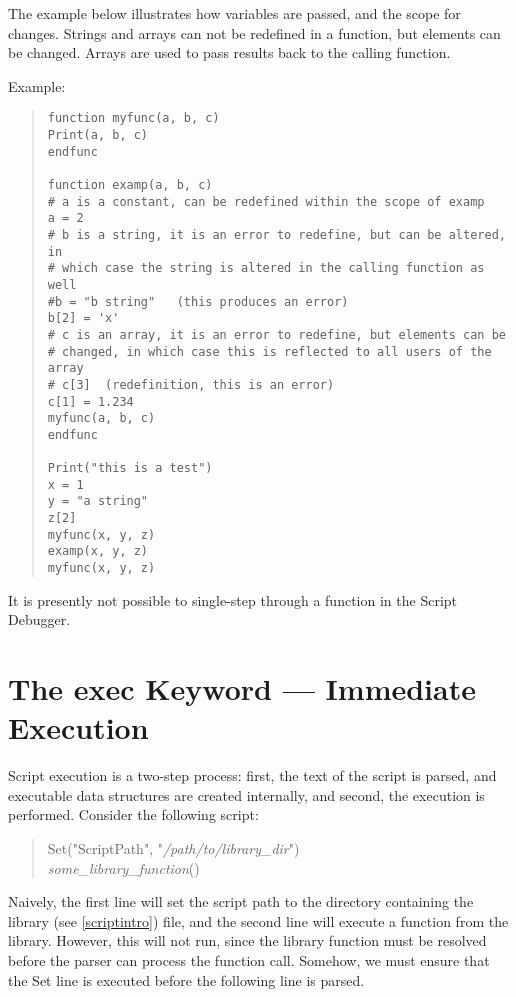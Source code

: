 The example below illustrates how variables are passed, and the
scope for changes.  Strings and arrays can not be redefined in a
function, but elements can be changed.  Arrays are used to pass
results back to the calling function.

Example:

\begin{quote}
\begin{verbatim}
function myfunc(a, b, c)
Print(a, b, c)
endfunc

function examp(a, b, c)
# a is a constant, can be redefined within the scope of examp
a = 2
# b is a string, it is an error to redefine, but can be altered, in
# which case the string is altered in the calling function as well
#b = "b string"   (this produces an error)
b[2] = 'x'
# c is an array, it is an error to redefine, but elements can be
# changed, in which case this is reflected to all users of the array
# c[3]  (redefinition, this is an error)
c[1] = 1.234
myfunc(a, b, c)
endfunc

Print("this is a test")
x = 1
y = "a string"
z[2]
myfunc(x, y, z)
examp(x, y, z)
myfunc(x, y, z)
\end{verbatim}
\end{quote}

It is presently not possible to single-step through a function in
the {\cb Script Debugger}.


\section{The {\vt exec} Keyword --- Immediate Execution}
\label{screxec}
Script execution is a two-step process:  first, the text of the script
is parsed, and executable data structures are created internally, and
second, the execution is performed.  Consider the following script:

\begin{quote}
{\vt Set("ScriptPath", "}{\it /path/to/library\_dir\/}{\vt ")}\\
{\it some\_library\_function\/}{\vt ()}
\end{quote}

Naively, the first line will set the script path to the directory
containing the {\vt library} (see \ref{scriptintro}) file, and the
second line will execute a function from the library.  However, this
will not run, since the library function must be resolved before the
parser can process the function call.  Somehow, we must ensure that
the {\vt Set} line is executed before the following line is parsed.

